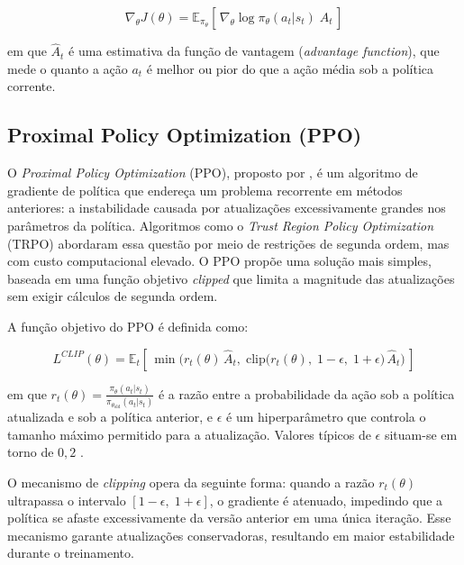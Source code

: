 \begin{equation}
    \nabla_\theta J(\theta)
    = \mathbb{E}_{\pi_\theta}
      \!\left[\,
        \nabla_\theta \log \pi_\theta(a_t | s_t) \; \hat{A}_t
      \,\right]
    \label{eq:policy-gradient}
\end{equation}

\noindent em que $\hat{A}_t$ é uma estimativa da função de vantagem
(\textit{advantage function}), que mede o quanto a ação $a_t$ é melhor ou pior
do que a ação média sob a política corrente.

\subsection{Proximal Policy Optimization (PPO)}
\label{subsec:ppo}

O \textit{Proximal Policy Optimization} (PPO), proposto por
, é um algoritmo de gradiente de política que
endereça um problema recorrente em métodos anteriores: a instabilidade causada
por atualizações excessivamente grandes nos parâmetros da política. Algoritmos
como o \textit{Trust Region Policy Optimization} (TRPO) abordaram essa questão
por meio de restrições de segunda ordem, mas com custo computacional elevado.
O PPO propõe uma solução mais simples, baseada em uma função objetivo
\textit{clipped} que limita a magnitude das atualizações sem exigir cálculos
de segunda ordem.

A função objetivo do PPO é definida como:

\begin{equation}
    L^{CLIP}(\theta)
    = \mathbb{E}_t \!\left[\,
        \min\!\Big(
            r_t(\theta) \, \hat{A}_t, \;
            \text{clip}\big(r_t(\theta),\; 1 - \epsilon,\; 1 + \epsilon\big)
            \, \hat{A}_t
        \Big)
    \,\right]
    \label{eq:ppo-clip}
\end{equation}

\noindent em que $r_t(\theta) = \frac{\pi_\theta(a_t | s_t)}
{\pi_{\theta_{\text{old}}}(a_t | s_t)}$ é a razão entre a probabilidade da
ação sob a política atualizada e sob a política anterior, e
$\epsilon$ é um hiperparâmetro que controla o tamanho máximo permitido
para a atualização. Valores típicos de $\epsilon$ situam-se em torno de
$0{,}2$ \cite{schulman2017ppo}.

O mecanismo de \textit{clipping} opera da seguinte forma: quando a razão
$r_t(\theta)$ ultrapassa o intervalo $[1 - \epsilon, \; 1 + \epsilon]$, o
gradiente é atenuado, impedindo que a política se afaste excessivamente da
versão anterior em uma única iteração. Esse mecanismo garante atualizações
conservadoras, resultando em maior estabilidade durante o treinamento.

